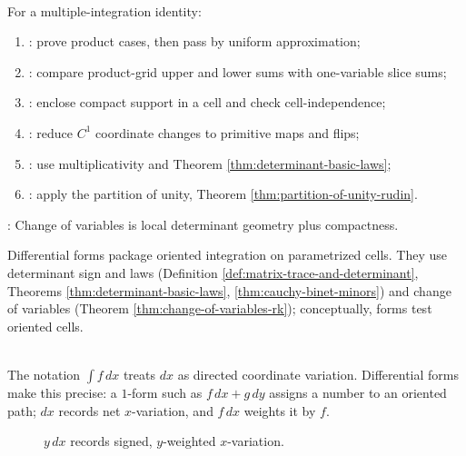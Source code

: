 \begin{method} \label{meth:multiple-integration-proof-patterns-source-todo}\label{meth:multiple-integration-proof-patterns} \\
For a multiple-integration identity:
\begin{enumerate}[label=(\roman*)]
\setlength{\itemsep}{0pt}
\item {}: prove product cases, then pass by uniform approximation;
\item {}: compare product-grid upper and lower sums with one-variable slice sums;
\item {}: enclose compact support in a cell and check cell-independence;
\item {}: reduce $C^1$ coordinate changes to primitive maps and flips;
\item {}: use multiplicativity and Theorem \ref{thm:determinant-basic-laws};
\item {}: apply the partition of unity, Theorem \ref{thm:partition-of-unity-rudin}.
\end{enumerate}
: Change of variables is local determinant geometry plus compactness.
\end{method}

Differential forms package oriented integration on parametrized cells. They use determinant sign and laws (Definition \ref{def:matrix-trace-and-determinant}, Theorems \ref{thm:determinant-basic-laws}, \ref{thm:cauchy-binet-minors}) and change of variables (Theorem \ref{thm:change-of-variables-rk}); conceptually, forms test oriented cells.

\begin{perspective} \label{per:differential-forms-as-functionals} \\
The notation $\int f\,dx$ treats $dx$ as directed coordinate variation. Differential forms make this precise: a $1$-form such as $f\,dx+g\,dy$ assigns a number to an oriented path; $dx$ records net $x$-variation, and $f\,dx$ weights it by $f$.
\end{perspective}

\begin{figure}[H]
  \centering
  
  \caption{$y\,dx$ records signed, $y$-weighted $x$-variation.}
  \label{fig:forms-weighted-variation-paths}
\end{figure}

